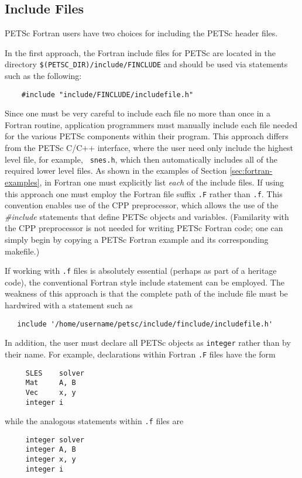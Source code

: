 \subsection{Include Files}
\label{sec:fortran_includes}

PETSc Fortran users have two choices for including the PETSc header 
files. 

\medskip

In the first  approach, 
the Fortran include files for PETSc are located in the directory 
{\tt \$(PETSC\_DIR)/include/FINCLUDE} and should be used via statements 
such as the following:
\begin{verbatim}
    #include "include/FINCLUDE/includefile.h"
\end{verbatim}
Since one must be very careful to include each file no more than once
in a Fortran routine, application programmers must manually include
each file needed for the various PETSc components within their
program.  This approach differs from the PETSc C/C++ interface, where
the user need only include the highest level file, for example, {\tt
snes.h}, which then automatically includes all of the required lower
level files.  As shown in the examples of Section
\ref{sec:fortran-examples}, in Fortran one must explicitly list {\em
each} of the include files. If using this approach one must employ
the Fortran file suffix {\tt .F}
rather than {\tt .f}.  This convention enables use of the CPP
preprocessor, which allows the use of the {\em \#include} statements
that define PETSc objects and variables. (Familarity with the CPP
preprocessor is not needed for writing PETSc Fortran code; one can simply
begin by copying a PETSc Fortran example and its corresponding
makefile.)  

\medskip

If working with {\tt .f} files is absolutely essential (perhaps as
part of a heritage code), the conventional Fortran style include
statement can be employed.  The weakness of this approach is that the
complete path of the include file must be hardwired with a statement such as
\begin{verbatim}
   include '/home/username/petsc/include/finclude/includefile.h'
\end{verbatim}
In addition, the user must declare all PETSc objects as {\tt integer} 
rather than by their name. For example, declarations within Fortran
{\tt .F} files have the form
\begin{verbatim}
     SLES    solver
     Mat     A, B
     Vec     x, y
     integer i
\end{verbatim}
while the analogous statements within {\tt .f} files are
\begin{verbatim}
     integer solver
     integer A, B
     integer x, y
     integer i
\end{verbatim}

